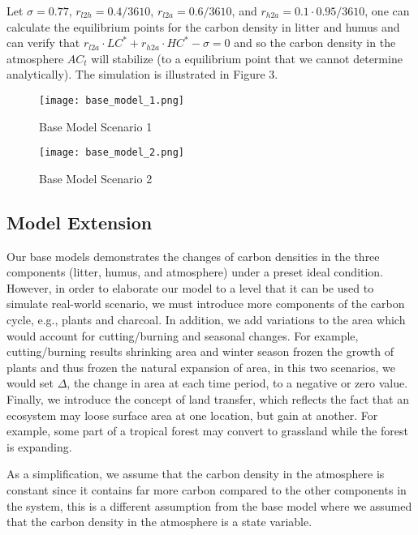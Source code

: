\documentclass[a4paper]{article}
\begin{document}
Let $\sigma = 0.77$, $r_{l2h} = 0.4/3610$, $r_{l2a} = 0.6/3610$, and $r_{h2a} = 0.1 \cdot 0.95 / 3610$, one can calculate the equilibrium points for the carbon density in litter and humus and can verify that $r_{l2a} \cdot LC^* + r_{h2a} \cdot HC^* - \sigma = 0$ and so the carbon density in the atmosphere $AC_t$ will stabilize (to a equilibrium point that we cannot determine analytically). The simulation is illustrated in Figure 3. 

\begin{figure}[!htb]
   \begin{minipage}{0.48\textwidth}
     \centering
     \texttt{[image: base\_model\_1.png]}
     \caption{Base Model Scenario 1}\label{Fig:Data1}
   \end{minipage}\hfill
   \begin{minipage}{0.48\textwidth}
     \centering
     \texttt{[image: base\_model\_2.png]}
     \caption{Base Model Scenario 2}\label{Fig:Data2}
   \end{minipage}
\end{figure}

\subsection{Model Extension}
Our base models demonstrates the changes of carbon densities in the three components (litter, humus, and atmosphere) under a preset ideal condition. However, in order to elaborate our model to a level that it can be used to simulate real-world scenario, we must introduce more components of the carbon cycle, e.g., plants and charcoal. In addition, we add variations to the area which would account for cutting/burning and seasonal changes. For example, cutting/burning results shrinking area and winter season frozen the growth of plants and thus frozen the natural expansion of area, in this two scenarios, we would set $\Delta$, the change in area at each time period, to a negative or zero value. Finally, we introduce the concept of land transfer, which reflects the fact that an ecosystem may loose surface area at one location, but gain at another. For example, some part of a tropical forest may convert to grassland while the forest is expanding. 

As a simplification, we assume that the carbon density in the atmosphere is constant since it contains far more carbon compared to the other components in the system, this is a different assumption from the base model where we assumed that the carbon density in the atmosphere is a state variable. 
\end{document}

